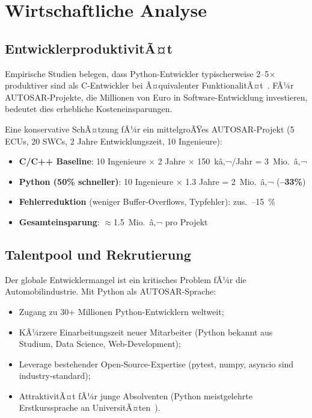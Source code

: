 ﻿\documentclass[12pt,a4paper,twoside]{article}
\begin{document}
\section{Wirtschaftliche Analyse}
\label{sec:wirtschaft}

\subsection{EntwicklerproduktivitÃ¤t}
\label{subsec:produktivitaet}

Empirische Studien belegen, dass Python-Entwickler
typischerweise 2--5$\times$ produktiver sind als C-Entwickler
bei Ã¤quivalenter FunktionalitÃ¤t~\cite{prechelt2000productivity, lutz2013learning}.
FÃ¼r AUTOSAR-Projekte, die Millionen von Euro in Software-Entwicklung
investieren, bedeutet dies erhebliche Kosteneinsparungen.

Eine konservative SchÃ¤tzung fÃ¼r ein mittelgroÃŸes AUTOSAR-Projekt
(5 ECUs, 20 SWCs, 2 Jahre Entwicklungszeit, 10 Ingenieure):
\begin{itemize}
  \item \textbf{C/C++ Baseline}: 10 Ingenieure $\times$ 2 Jahre $\times$ 150~kâ‚¬/Jahr = 3~Mio.\ â‚¬
  \item \textbf{Python (50\% schneller)}: 10 Ingenieure $\times$ 1.3 Jahre = 2~Mio.\ â‚¬ (\textbf{--33\%})
  \item \textbf{Fehlerreduktion} (weniger Buffer-Overflows, Typfehler): zus.\ --15~\%
  \item \textbf{Gesamteinsparung}: $\approx$1.5~Mio.\ â‚¬ pro Projekt
\end{itemize}

\subsection{Talentpool und Rekrutierung}
\label{subsec:talentpool}

Der globale Entwicklermangel ist ein kritisches Problem fÃ¼r die Automobilindustrie.
Mit Python als AUTOSAR-Sprache:
\begin{itemize}
  \item Zugang zu 30+ Millionen Python-Entwicklern weltweit;
  \item KÃ¼rzere Einarbeitungszeit neuer Mitarbeiter (Python bekannt aus
        Studium, Data Science, Web-Development);
  \item Leverage bestehender Open-Source-Expertise
        (pytest, numpy, asyncio sind industry-standard);
  \item AttraktivitÃ¤t fÃ¼r junge Absolventen (Python meistgelehrte
        Erstkurssprache an UniversitÃ¤ten~\cite{python_courses2023}).
\end{itemize}
\end{document}
